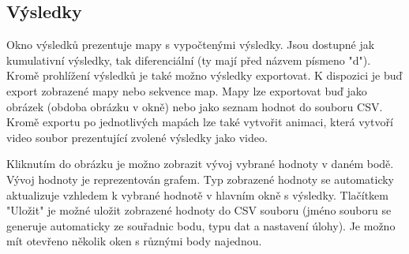 \documentclass[a4paper,12pt]{article}
\begin{document}
\subsection{Výsledky}
\begin{figure}[H]
\end{figure}
Okno výsledků prezentuje mapy s vypočtenými výsledky. Jsou dostupné jak kumulativní výsledky, tak diferenciální (ty mají před názvem písmeno "d"). Kromě prohlížení výsledků je také možno výsledky exportovat. K dispozici je buď export zobrazené mapy nebo sekvence map. Mapy lze exportovat buď jako obrázek (obdoba obrázku v okně) nebo jako seznam hodnot do souboru CSV. Kromě exportu po jednotlivých mapách lze také vytvořit animaci, která vytvoří video soubor prezentující zvolené výsledky jako video.
\begin{figure}[H]
\end{figure}
Kliknutím do obrázku je možno zobrazit vývoj vybrané hodnoty v daném bodě. Vývoj hodnoty je reprezentován grafem. Typ zobrazené hodnoty se automaticky aktualizuje vzhledem k vybrané hodnotě v hlavním okně s výsledky. Tlačítkem "Uložit" je možné uložit zobrazené hodnoty do CSV souboru (jméno souboru se generuje automaticky ze souřadnic bodu, typu dat a nastavení úlohy). Je možno mít otevřeno několik oken s různými body najednou.
\newpage
\end{document}
